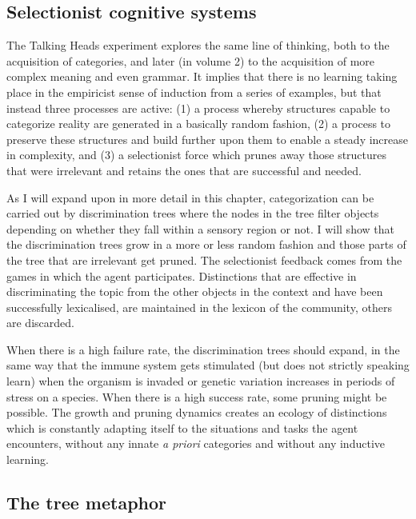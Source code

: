 \subsection{Selectionist cognitive systems}

The Talking Heads experiment explores the same line of thinking, 
both to the acquisition of categories, and later
(in volume 2) to the acquisition of more complex meaning 
and even grammar. It implies
that there is no learning taking place in the empiricist sense 
of induction from a series of examples, but that instead 
three processes are active: 
(1) a process whereby structures capable to categorize
reality are generated in a basically random fashion, 
(2) a process to preserve these structures and build 
further upon them to enable a steady increase in 
complexity, and (3) a selectionist force which
prunes away those structures that were irrelevant and 
retains the ones that are successful and needed. 

As I will expand upon in more detail in this 
chapter, categorization
can be carried out by discrimination trees where the 
nodes in the tree filter objects depending on whether they 
fall within a sensory region or not. I will show that
the discrimination trees grow in a more or
less random fashion and 
those parts of the tree that are irrelevant get pruned. 
The selectionist feedback comes from the games in which 
the agent participates. Distinctions that are effective
in discriminating the topic from the other objects in 
the context and have been successfully lexicalised, 
are maintained in the lexicon of the
community, others are discarded.

When there is a high failure rate, the discrimination trees 
should expand, in the same way that the immune system gets 
stimulated (but does not strictly speaking
learn) when the organism is
invaded or genetic variation increases in periods
of stress on a species. When there is a high
success rate, some pruning
might be possible. The growth and pruning dynamics creates an 
ecology of distinctions which is constantly 
adapting itself to the situations and tasks 
the agent encounters, without any innate {\itshape a priori}
categories and without any inductive learning. 

\subsection{The tree metaphor}

